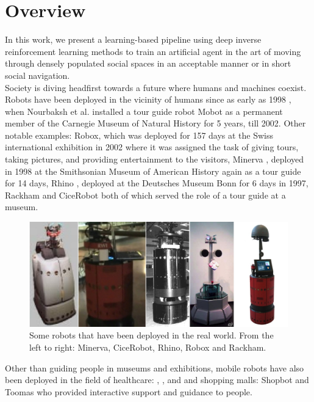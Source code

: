 \label{ch:introduction}
\section{Overview}
In this work, we present a learning-based pipeline using deep inverse reinforcement learning methods to train an artificial agent in the art of moving through densely populated social spaces in an acceptable manner or in short social navigation.\\
Society is diving headfirst towards a future where humans and machines coexist. Robots have been deployed in the vicinity of humans since as early as 1998 \cite{Nourbaksh2003Movot}, when Nourbaksh et al. installed a tour guide robot Mobot as a permanent member of the Carnegie Museum of Natural History for 5 years, till 2002. Other notable examples: Robox, \cite{siciliano_robox_2003} which was deployed for 157 days at the Swiss international exhibition in 2002 where it was assigned the task of giving tours, taking pictures, and providing entertainment to the visitors, Minerva \cite{minerva_thrun_2000}, deployed in 1998 at the Smithsonian Museum of American History again as a tour guide for 14 days, Rhino \cite{fox_dynamic_1997}, deployed at the Deutsches Museum Bonn for 6 days in 1997, Rackham \cite{rackham_clodic_2006} and CiceRobot \cite{chella_perception_2009} both of which served the role of a tour guide at a museum.\\
\vspace{3cm}
\begin{figure}
	\label{fig:real-world-robots}
	\centering
	\includegraphics[width=\linewidth]{figures/minerva_cice_rhino_robox_rackham.jpg}
	\caption{Some robots that have been deployed in the real world. From the left to right: Minerva, CiceRobot, Rhino, Robox and Rackham.}
\end{figure}

Other than guiding people in museums and exhibitions, mobile robots have also been deployed in the field of healthcare: \cite{pearl_pollack_2002}, \cite{kim_socially_2016}, and \cite{kuderer_feature-based_nodate} and shopping malls: Shopbot \cite{shopbot_kanada} and Toomas \cite{toomas_gross_2009} who provided interactive support and guidance to people. 

